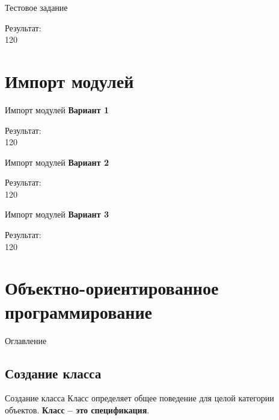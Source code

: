 \documentclass[12pt]{beamer}
\begin{document}
\begin{frame}{Тестовое задание}
\vspace{0.2cm}

\vspace{0.5cm}
Результат: \\
120 \\
\end{frame}

\section{Импорт модулей}
\begin{frame}{Импорт модулей}
\textbf{Вариант 1}
\vspace{0.5cm}

\vspace{0.5cm}
Результат: \\
120 \\
\end{frame}


\begin{frame}{Импорт модулей}
\textbf{Вариант 2}
\vspace{0.5cm}

\vspace{0.5cm}
Результат: \\
120 \\
\end{frame}


\begin{frame}{Импорт модулей}
\textbf{Вариант 3}
\vspace{0.5cm}

\vspace{0.5cm}
Результат: \\
120 \\
\end{frame}

\section{Объектно-ориентированное программирование}
\begin{frame}[t]{Оглавление}
\tableofcontents[currentsection]
\end{frame}

\subsection{Создание класса}
\begin{frame}{Создание класса}
Класс определяет общее поведение для целой категории объектов. \textbf{Класс -- это спецификация}.

\end{frame}
\end{document}
